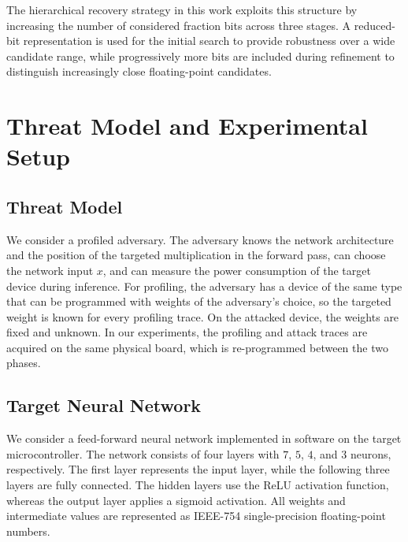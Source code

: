\documentclass[conference]{IEEEtran}
\begin{document}
The hierarchical recovery strategy in this work exploits this structure by increasing the number of considered fraction bits across three stages.
A reduced-bit representation is used for the initial search to provide robustness over a wide candidate range, while progressively more bits are included during refinement to distinguish increasingly close floating-point candidates.

\section{Threat Model and Experimental Setup}
\label{sec:experimental-setup}

\subsection{Threat Model}
\label{sec:threat-model}

We consider a profiled adversary.
The adversary knows the network architecture and the position of the targeted multiplication in the forward pass, can choose the network input $x$, and can measure the power consumption of the target device during inference.
For profiling, the adversary has a device of the same type that can be programmed with weights of the adversary's choice, so the targeted weight is known for every profiling trace.
On the attacked device, the weights are fixed and unknown.
In our experiments, the profiling and attack traces are acquired on the same physical board, which is re-programmed between the two phases.

\subsection{Target Neural Network}
\label{sec:target-network}

We consider a feed-forward neural network implemented in software on the target microcontroller.
The network consists of four layers with $7$, $5$, $4$, and $3$ neurons, respectively.
The first layer represents the input layer, while the following three layers are fully connected.
The hidden layers use the ReLU activation function, whereas the output layer applies a sigmoid activation.
All weights and intermediate values are represented as IEEE-754 single-precision floating-point numbers.
\end{document}
